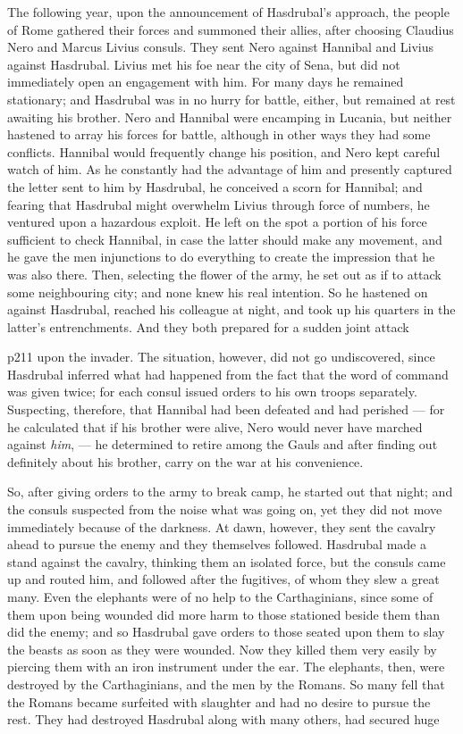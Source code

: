The following year, upon the announcement of Hasdrubal's approach, the people of Rome gathered their forces and summoned their allies, after choosing Claudius Nero and Marcus Livius consuls. They sent Nero against Hannibal and Livius against Hasdrubal. Livius met his foe near the city of Sena, but did not immediately open an engagement with him. For many days he remained stationary; and Hasdrubal was in no hurry for battle, either, but remained at rest awaiting his brother. Nero and Hannibal were encamping in Lucania, but neither hastened to array his forces for battle, although in other ways they had some conflicts. Hannibal would frequently change his position, and Nero kept careful watch of him. As he constantly had the advantage of him and presently captured the letter sent to him by Hasdrubal, he conceived a scorn for Hannibal; and fearing that Hasdrubal might overwhelm Livius through force of numbers, he ventured upon a hazardous exploit. He left on the spot a portion of his force sufficient to check Hannibal, in case the latter should make any movement, and he gave the men injunctions to do everything to create the impression that he was also there. Then, selecting the flower of the army, he set out as if to attack some neighbouring city; and none knew his real intention. So he hastened on against Hasdrubal, reached his colleague at night, and took up his quarters in the latter's entrenchments. And they both prepared for a sudden joint attack

p211 upon the invader. The situation, however, did not go undiscovered, since Hasdrubal inferred what had happened from the fact that the word of command was given twice; for each consul issued orders to his own troops separately. Suspecting, therefore, that Hannibal had been defeated and had perished \texthebrew{—} for he calculated that if his brother were alive, Nero would never have marched against \emph{him}, \texthebrew{—} he determined to retire among the Gauls and after finding out definitely about his brother, carry on the war at his convenience.

So, after giving orders to the army to break camp, he started out that night; and the consuls suspected from the noise what was going on, yet they did not move immediately because of the darkness. At dawn, however, they sent the cavalry ahead to pursue the enemy and they themselves followed. Hasdrubal made a stand against the cavalry, thinking them an isolated force, but the consuls came up and routed him, and followed after the fugitives, of whom they slew a great many. Even the elephants were of no help to the Carthaginians, since some of them upon being wounded did more harm to those stationed beside them than did the enemy; and so Hasdrubal gave orders to those seated upon them to slay the beasts as soon as they were wounded. Now they killed them very easily by piercing them with an iron instrument under the ear. The elephants, then, were destroyed by the Carthaginians, and the men by the Romans. So many fell that the Romans became surfeited with slaughter and had no desire to pursue the rest. They had destroyed Hasdrubal along with many others, had secured huge

